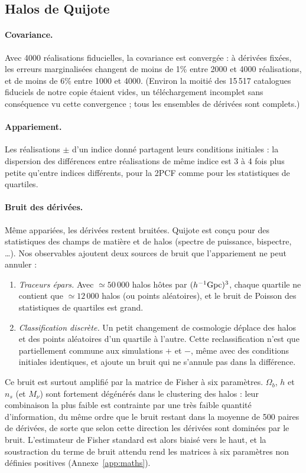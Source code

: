 \documentclass[11pt,twocolumn]{article}
\begin{document}
\subsection{Halos de Quijote}
\label{sec:quijote}

\paragraph{Covariance.} Avec 4000 réalisations fiducielles, la covariance est convergée : à dérivées fixées, les erreurs marginalisées changent de moins de 1\% entre 2000 et 4000 réalisations, et de moins de 6\% entre 1000 et 4000. (Environ la moitié des 15\,517 catalogues fiduciels de notre copie étaient vides, un téléchargement incomplet sans conséquence vu cette convergence ; tous les ensembles de dérivées sont complets.)

\paragraph{Appariement.} Les réalisations $\pm$ d'un indice donné partagent leurs conditions initiales : la dispersion des différences entre réalisations de même indice est 3 à 4 fois plus petite qu'entre indices différents, pour la 2PCF comme pour les statistiques de quartiles.

\paragraph{Bruit des dérivées.} Même appariées, les dérivées restent bruitées. Quijote est conçu pour des statistiques des champs de matière et de halos (spectre de puissance, bispectre, \dots). Nos observables ajoutent deux sources de bruit que l'appariement ne peut annuler :
\begin{enumerate}
\item \emph{Traceurs épars.} Avec $\simeq50\,000$ halos hôtes par $(h^{-1}{\rm Gpc})^3$, chaque quartile ne contient que $\simeq12\,000$ halos (ou points aléatoires), et le bruit de Poisson des statistiques de quartiles est grand.
\item \emph{Classification discrète.} Un petit changement de cosmologie déplace des halos et des points aléatoires d'un quartile à l'autre. Cette reclassification n'est que partiellement commune aux simulations $+$ et $-$, même avec des conditions initiales identiques, et ajoute un bruit qui ne s'annule pas dans la différence.
\end{enumerate}
Ce bruit est surtout amplifié par la matrice de Fisher à six paramètres. $\Omega_b$, $h$ et $n_s$ (et $M_\nu$) sont fortement dégénérés dans le clustering des halos : leur combinaison la plus faible est contrainte par une très faible quantité d'information, du même ordre que le bruit restant dans la moyenne de 500 paires de dérivées, de sorte que selon cette direction les dérivées sont dominées par le bruit. L'estimateur de Fisher standard est alors biaisé vers le haut, et la soustraction du terme de bruit attendu rend les matrices à six paramètres non définies positives (Annexe~\ref{app:maths}).
\end{document}
